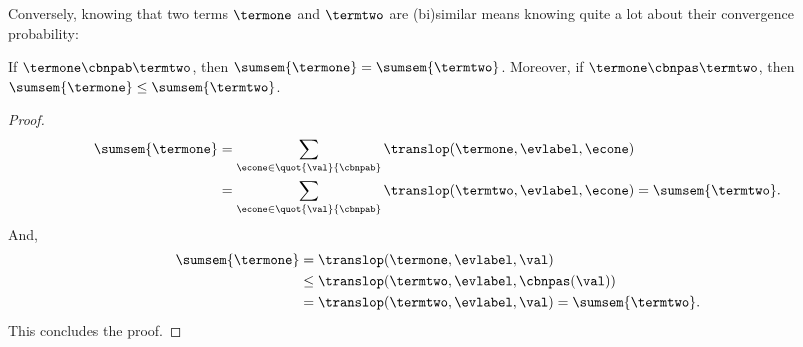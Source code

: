 Conversely, knowing that two terms $\termone$ and
$\termtwo$ are (bi)similar means knowing quite a lot about their
convergence probability:
\begin{lemma}\label{lemma:sumsempabCBN}
  If $\termone\cbnpab\termtwo$, then $\sumsem{\termone}=\sumsem{\termtwo}$. Moreover,
  if $\termone\cbnpas\termtwo$, then $\sumsem{\termone}\leq\sumsem{\termtwo}$.
\end{lemma}
\begin{proof}
  \begin{align*}
    \sumsem{\termone}&=\sum_{\econe\in\quot{\val}{\cbnpab}}\translop(\termone,\evlabel,\econe)\\
    &=
    \sum_{\econe\in\quot{\val}{\cbnpab}}\translop(\termtwo,\evlabel,\econe)=\sumsem{\termtwo}.
  \end{align*} 
  And, 
  \begin{align*}
    \sumsem{\termone}&=\translop(\termone,\evlabel,\val)\\
    &\leq\translop(\termtwo,\evlabel,\cbnpas(\val))\\
    &=\translop(\termtwo,\evlabel,\val)=\sumsem{\termtwo}.
  \end{align*}
  This concludes the proof.
\end{proof}
